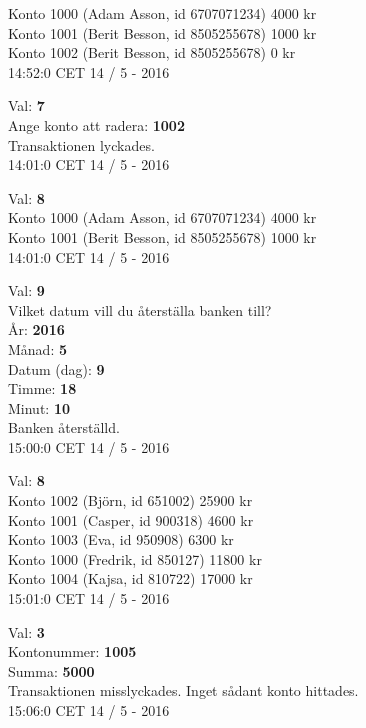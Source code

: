 \begin{multicols}{2}
\begin{exampleblock}
Konto 1000 (Adam Asson, id 6707071234) 4000 kr\\
Konto 1001 (Berit Besson, id 8505255678) 1000 kr\\
Konto 1002 (Berit Besson, id 8505255678) 0 kr\\
14:52:0 CET 14 / 5 - 2016\\
\end{exampleblock}
\begin{exampleblock}
Val: \textbf{7}\\
Ange konto att radera: \textbf{1002}\\
Transaktionen lyckades.\\
14:01:0 CET 14 / 5 - 2016\\
\end{exampleblock}
\begin{exampleblock}
Val: \textbf{8}\\
Konto 1000 (Adam Asson, id 6707071234) 4000 kr\\
Konto 1001 (Berit Besson, id 8505255678) 1000 kr\\
14:01:0 CET 14 / 5 - 2016\\
\end{exampleblock}
\begin{exampleblock}
Val: \textbf{9}\\
Vilket datum vill du återställa banken till?\\
År: \textbf{2016}\\
Månad: \textbf{5}\\
Datum (dag): \textbf{9}\\
Timme: \textbf{18}\\
Minut: \textbf{10}\\
Banken återställd.\\
15:00:0 CET 14 / 5 - 2016\\
\end{exampleblock}
\begin{exampleblock}
Val: \textbf{8}\\
Konto 1002 (Björn, id 651002) 25900 kr\\
Konto 1001 (Casper, id 900318) 4600 kr\\
Konto 1003 (Eva, id 950908) 6300 kr\\
Konto 1000 (Fredrik, id 850127) 11800 kr\\
Konto 1004 (Kajsa, id 810722) 17000 kr\\
15:01:0 CET 14 / 5 - 2016\\
\end{exampleblock}
\begin{exampleblock}
Val: \textbf{3}\\
Kontonummer: \textbf{1005}\\
Summa: \textbf{5000}\\
Transaktionen misslyckades. Inget sådant konto hittades.\\
15:06:0 CET 14 / 5 - 2016\\
\end{exampleblock}

\end{multicols}
